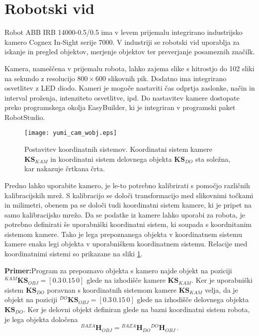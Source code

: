 \section{Robotski vid}

Robot ABB IRB 14000-0.5/0.5 ima v levem prijemalu integrirano industrijsko kamero Cognex In-Sight serije 7000. V industriji se robotski vid uporablja za iskanje in pregled objektov, merjenje objektov ter preverjanje posameznih značilk.

Kamera, nameščena v prijemalu robota, lahko zajema slike s hitrostjo do 102 sliki na sekundo z resolucijo $800 \times 600$ slikovnih pik. Dodatno ima integrirano osvetlitev z LED diodo. Kameri je mogoče nastaviti čas odprtja zaslonke, način in interval proženja, intenziteto osvetlitve, ipd. Do nastavitev kamere dostopate preko programskega okolja EasyBuilder, ki je integriran v programski paket RobotStudio.

\begin{figure}[!hbt]
	\centering
	\texttt{[image: yumi\_cam\_wobj.eps]}
	\caption{Postavitev koordinatnih sistemov. Koordinatni sistem kamere $\textbf{KS}_{KAM}$ in koordinatni sistem delovnega objekta $\textbf{KS}_{DO}$ sta soležna, kar nakazuje črtkana črta.}
	\label{fig:yumi_kam_wobj}
\end{figure}


Predno lahko uporabite kamero, je le-to potrebno kalibrirati s pomočjo različnih kalibracijskih mrež. S kalibracijo se določi transformacijo med slikovnimi točkami in milimetri, obenem pa se določi tudi koordinatni sistem kamere, ki je pripet na samo kalibracijsko mrežo. Da se podatke iz kamere lahko uporabi za robota, je potrebno definirati še uporabniški koordinatni sistem, ki soupada s koordnitanim sistemom kamere. Tako je lega prepoznanega objekta v koordinatnem sistemu kamere enaka legi objekta v uporabniškem koordinatnem sistemu. Relacije med koordinatnimi sistemi so prikazane na sliki \ref{fig:yumi_kam_wobj}.


\newpage
\begin{mdframed}[backgroundcolor=blue!20, shadow=true,roundcorner=8pt]
	\textbf{Primer:}Program za prepoznavo objekta s kamero najde objekt na poziciji ${}^{KAM}\textbf{KS}_{OBJ} = [0.3\, 0.15\, 0]$ glede na izhodišče kamere $\textbf{KS}_{KAM}$. Ker je uporabniški sistem $\textbf{KS}_{DO}$ poravnan s koordinatnih sistemom kamere $\textbf{KS}_{KAM}$ velja, da je objekt na poziciji ${}^{DO}\textbf{KS}_{OBJ} = [0.3\, 0.15\, 0]$ glede na izhodišče delovnega objekta $\textbf{KS}_{DO}$. Ker je delovni objekt definiran glede na bazni koordinatni sistem robota, je lega objekta določena
	\begin{equation*}
		{}^{BAZA}\textbf{H}_{OBJ} = {}^{BAZA}\textbf{H}_{DO}  {}^{DO}\textbf{H}_{OBJ} \,.
	\end{equation*}
\end{mdframed}


